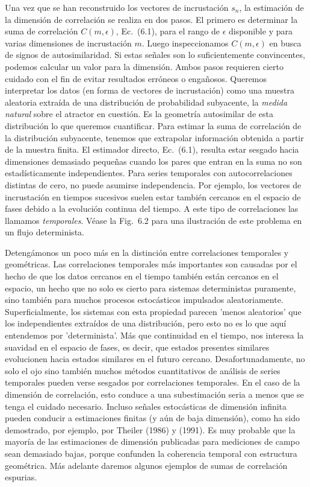 \documentclass[10pt,a4paper]{book}
\begin{document}
Una vez que se han reconstruido los vectores de incrustación $s_n$, la estimación de la dimensión de correlación se realiza en dos pasos. El primero es determinar la suma de correlación $C(m, \epsilon)$, Ec.~(6.1), para el rango de $\epsilon$ disponible y para varias dimensiones de incrustación $m$. Luego inspeccionamos $C(m, \epsilon)$ en busca de signos de autosimilaridad. Si estas señales son lo suficientemente convincentes, podemos calcular un valor para la dimensión. Ambos pasos requieren cierto cuidado con el fin de evitar resultados erróneos o engañosos. Queremos interpretar los datos (en forma de vectores de incrustación) como una muestra aleatoria extraída de una distribución de probabilidad subyacente, la \textit{medida natural} sobre el atractor en cuestión. Es la geometría autosimilar de esta distribución lo que queremos cuantificar. Para estimar la suma de correlación de la distribución subyacente, tenemos que extrapolar información obtenida a partir de la muestra finita. El estimador directo, Ec.~(6.1), resulta estar sesgado hacia dimensiones demasiado pequeñas cuando los pares que entran en la suma no son estadísticamente independientes. Para series temporales con autocorrelaciones distintas de cero, no puede asumirse independencia. Por ejemplo, los vectores de incrustación en tiempos sucesivos suelen estar también cercanos en el espacio de fases debido a la evolución continua del tiempo. A este tipo de correlaciones las llamamos \textit{temporales}. Véase la Fig.~6.2 para una ilustración de este problema en un flujo determinista.


\bigskip

Detengámonos un poco más en la distinción entre correlaciones temporales y geométricas. Las correlaciones temporales más importantes son causadas por el hecho de que los datos cercanos en el tiempo también están cercanos en el espacio, un hecho que no solo es cierto para sistemas deterministas puramente, sino también para muchos procesos estocásticos impulsados aleatoriamente. Superficialmente, los sistemas con esta propiedad parecen 'menos aleatorios' que los independientes extraídos de una distribución, pero esto no es lo que aquí entendemos por 'determinista'. Más que continuidad en el tiempo, nos interesa la suavidad en el espacio de fases, es decir, que estados presentes similares evolucionen hacia estados similares en el futuro cercano. Desafortunadamente, no solo el ojo sino también muchos métodos cuantitativos de análisis de series temporales pueden verse sesgados por correlaciones temporales. En el caso de la dimensión de correlación, esto conduce a una subestimación seria a menos que se tenga el cuidado necesario. Incluso señales estocásticas de dimensión infinita pueden conducir a estimaciones finitas (y aún de baja dimensión), como ha sido demostrado, por ejemplo, por Theiler (1986) y (1991). Es muy probable que la mayoría de las estimaciones de dimensión publicadas para mediciones de campo sean demasiado bajas, porque confunden la coherencia temporal con estructura geométrica. Más adelante daremos algunos ejemplos de sumas de correlación espurias.
\end{document}
